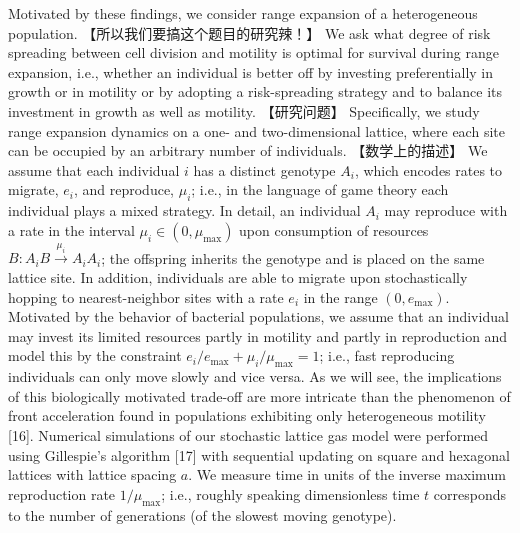 Motivated by these findings, we consider range expansion of a heterogeneous population. 【所以我们要搞这个题目的研究辣！】 We ask what degree of risk spreading between cell division and motility is optimal for survival during range expansion, i.e., whether an individual is better off by investing preferentially in growth or in motility or by adopting a risk-spreading strategy and to balance its investment in growth as well as motility. 【研究问题】 Specifically, we study range expansion dynamics on a one- and two-dimensional lattice, where each site can be occupied by an arbitrary number of individuals. 【数学上的描述】 We assume that each individual $i$ has a distinct genotype $A_i$, which encodes rates to migrate, $e_i$, and reproduce, $\mu_i$; i.e., in the language of game theory each individual plays a mixed strategy. In detail, an individual $A_i$ may reproduce with a rate in the interval $\mu_i\in(0,\mu_{\max})$ upon consumption of resources $B : A_i B \stackrel{\mu_i}{\to}A_iA_i$; the offspring inherits the genotype and is placed on the same lattice site. In addition, individuals are able to migrate upon stochastically hopping to nearest-neighbor sites with a rate $e_i$ in the range $(0, e_{\max})$. Motivated by the behavior of bacterial populations, we assume that an individual may invest its limited resources partly in motility and partly in reproduction and model this by the constraint $e_i / e_{\max} + \mu_i / \mu_{\max} = 1 $; i.e., fast reproducing individuals can only move slowly and vice versa. As we will see, the implications of this biologically motivated trade-off are more intricate than the phenomenon of front acceleration found in populations exhibiting only heterogeneous motility [16]. Numerical simulations of our stochastic lattice gas model were performed using Gillespie’s algorithm [17] with sequential updating on square and hexagonal lattices with lattice spacing $a$. We measure time in units of the inverse maximum reproduction rate $1 / \mu_{\max}$; i.e., roughly speaking dimensionless time $t$ corresponds to the number of generations (of the slowest moving genotype).





% 
% 